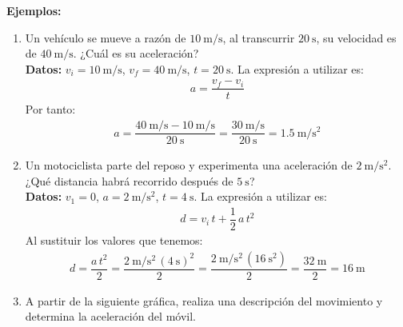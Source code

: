 \documentclass[14pt]{extarticle}
\begin{document}
\newpage

\noindent
\textbf{Ejemplos: }
\begin{enumerate}[label=\roman*)]
\item Un vehículo se mueve a razón de $\SI{10}{\meter\per\second}$, al transcurrir $\SI{20}{\second}$, su velocidad es de $\SI{40}{\meter\per\second}$. ¿Cuál es su aceleración?
\\[0.5em]
\textbf{Datos:} $v_{i} = \SI{10}{\meter\per\second}$, $v_{f} = \SI{40}{\meter\per\second}$, $t = \SI{20}{\second}$. La expresión a utilizar es:
\begin{align*}
a = \dfrac{v_{f} - v_{i}}{t}
\end{align*}
Por tanto:
\begin{align*}
a = \dfrac{\SI{40}{\meter\per\second} - \SI{10}{\meter\per\second}}{\SI{20}{\second}} = \dfrac{\SI{30}{\meter\per\second}}{\SI{20}{\second}} = \SI{1.5}{\meter\per\square\second}
\end{align*}
\item Un motociclista parte del reposo y experimenta una aceleración de $\SI{2}{\meter\per\square\second}$. ¿Qué distancia habrá recorrido después de $\SI{5}{\second}$?
\\[0.5em]
\textbf{Datos:} $v_{1} = 0$, $a = \SI{2}{\meter\per\square\second}$, $t = \SI{4}{\second}$. La expresión a utilizar es:
\begin{align*}
d = v_{i} \, t + \dfrac{1}{2} \, a \, t^{2}
\end{align*}
Al sustituir los valores que tenemos:
\begin{align*}
d = \dfrac{a \, t^{2}}{2} = \dfrac{\SI{2}{\meter\per\square\second} \, (\SI{4}{\second})^{2}}{2} = \dfrac{\SI{2}{\meter\per\square\second} \, (\SI{16}{\square\second})}{2} = \dfrac{\SI{32}{\meter}}{2} = \SI{16}{\meter}
\end{align*}
\item A partir de la siguiente gráfica, realiza una descripción del movimiento y determina la aceleración del móvil.
\begin{figure}[H]
     \centering
\end{figure}
\end{enumerate}
\end{document}
